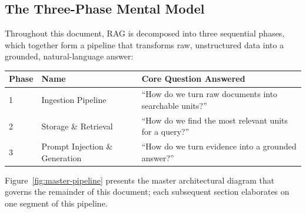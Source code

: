 \documentclass[11pt,a4paper]{article}
\begin{document}
\subsection{The Three-Phase Mental Model}

Throughout this document, RAG is decomposed into three sequential phases, which together form a pipeline that transforms raw, unstructured data into a grounded, natural-language answer:

\begin{center}
\begin{tabular}{@{}lll@{}}
\toprule
\textbf{Phase} & \textbf{Name} & \textbf{Core Question Answered} \\
\midrule
1 & Ingestion Pipeline & ``How do we turn raw documents into searchable units?'' \\
2 & Storage \& Retrieval & ``How do we find the most relevant units for a query?'' \\
3 & Prompt Injection \& Generation & ``How do we turn evidence into a grounded answer?'' \\
\bottomrule
\end{tabular}
\end{center}

Figure~\ref{fig:master-pipeline} presents the master architectural diagram that governs the remainder of this document; each subsequent section elaborates on one segment of this pipeline.
\end{document}
